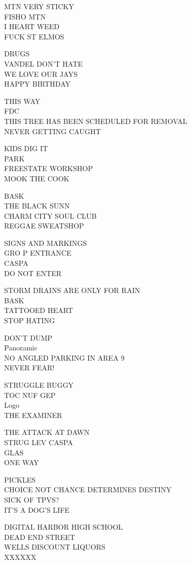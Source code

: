 \documentclass[10pt,letterpaper]{article}
\begin{document}
MTN VERY STICKY\\
FISHO MTN\\
I HEART WEED\\
FUCK ST ELMOS

DRUGS\\
VANDEL DON'T HATE\\
WE LOVE OUR JAYS\\
HAPPY BIRTHDAY

THIS WAY\\
FDC\\
THIS TREE HAS BEEN SCHEDULED FOR REMOVAL\\
NEVER GETTING CAUGHT

KIDS DIG IT\\
PARK\\
FREESTATE WORKSHOP\\
MOOK THE COOK

BASK\\
THE BLACK SUNN\\
CHARM CITY SOUL CLUB\\
REGGAE SWEATSHOP

SIGNS AND MARKINGS\\
GRO P ENTRANCE\\
CASPA\\
DO NOT ENTER

STORM DRAINS ARE ONLY FOR RAIN\\
BASK\\
TATTOOED HEART\\
STOP HATING

DON'T DUMP\\
Panoramic\\
NO ANGLED PARKING IN AREA 9\\
NEVER FEAR!

STRUGGLE BUGGY\\
TOC NUF GEP\\
Logo\\
THE EXAMINER

THE ATTACK AT DAWN\\
STRUG LEV CASPA\\
GLAS\\
ONE WAY

PICKLES\\
CHOICE NOT CHANCE DETERMINES DESTINY\\
SICK OF TPVS?\\
IT'S A DOG'S LIFE

DIGITAL HARBOR HIGH SCHOOL\\
DEAD END STREET\\
WELLS DISCOUNT LIQUORS\\
XXXXXX
\end{document}
